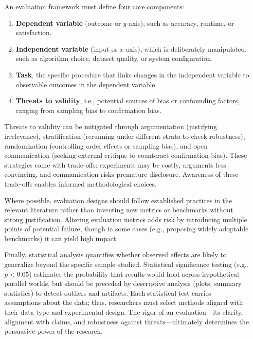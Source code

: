 An evaluation framework must define four core components:
\begin{enumerate}
    \item \textbf{Dependent variable} (outcome or $y$-axis), such as accuracy, runtime, or satisfaction.
    \item \textbf{Independent variable} (input or $x$-axis), which is deliberately manipulated, such as algorithm choice, dataset quality, or system configuration.
    \item \textbf{Task}, the specific procedure that links changes in the independent variable to observable outcomes in the dependent variable.
    \item \textbf{Threats to validity}, i.e., potential sources of bias or confounding factors, ranging from sampling bias to confirmation bias.
\end{enumerate}

Threats to validity can be mitigated through argumentation (justifying irrelevance), stratification (rerunning under different strata to check robustness), randomization (controlling order effects or sampling bias), and open communication (seeking external critique to counteract confirmation bias).
These strategies come with trade-offs: experiments may be costly, arguments less convincing, and communication risks premature disclosure.
Awareness of these trade-offs enables informed methodological choices.

Where possible, evaluation designs should follow established practices in the relevant literature rather than inventing new metrics or benchmarks without strong justification.
Altering evaluation metrics adds risk by introducing multiple points of potential failure, though in some cases (e.g., proposing widely adoptable benchmarks) it can yield high impact.

Finally, statistical analysis quantifies whether observed effects are likely to generalize beyond the specific sample studied.
Statistical significance testing (e.g., $p < 0.05$) estimates the probability that results would hold across hypothetical parallel worlds, but should be preceded by descriptive analysis (plots, summary statistics) to detect outliers and artifacts.
Each statistical test carries assumptions about the data; thus, researchers must select methods aligned with their data type and experimental design.
The rigor of an evaluation---its clarity, alignment with claims, and robustness against threats---ultimately determines the persuasive power of the research.
